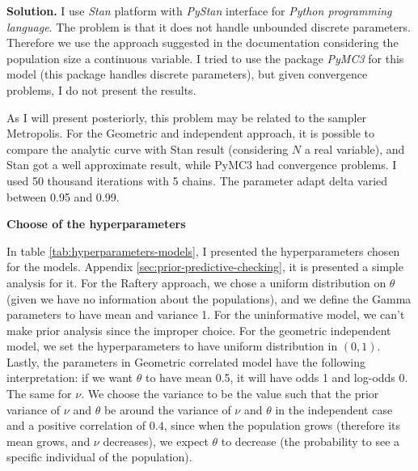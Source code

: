 \vspace{2ex}

    {\bf Solution.} I use {\em Stan} platform with {\em PyStan} interface for
    {\em Python programming language}. The problem is that it does not handle
    unbounded discrete parameters. Therefore we use the approach suggested in
    the documentation \cite{stan} considering the population size a continuous
    variable. I tried to use the package {\em PyMC3} for this model (this
    package handles discrete parameters), but given convergence problems,
    I do not present the results. 
    
    \ind As I will present posteriorly, this problem
    may be related to the sampler Metropolis. For the Geometric and
    independent approach, it is possible to compare the analytic curve with
    Stan result (considering $N$ a real variable), and Stan got a well
    approximate result, while PyMC3 had convergence problems. I used 50
    thousand iterations with 5 chains. The parameter adapt delta varied
    between 0.95 and 0.99. 

    \vspace{2ex}

    {\bf Choose of the hyperparameters}

    \vspace{2ex}

    \ind In table \ref{tab:hyperparameters-models}, I presented the hyperparameters
    chosen for the models. Appendix \ref{sec:prior-predictive-checking}, it is
    presented a simple analysis for it. For the Raftery approach, we chose a
    uniform distribution on $\theta$ (given we have no information about the
    populations), and we define the Gamma parameters to have mean and variance
    1. For the uninformative model, we can't make prior analysis since the
    improper choice. For the geometric independent model, we set the
    hyperparameters to have uniform distribution in $(0,1)$. Lastly, the
    parameters in Geometric correlated model have the following
    interpretation: if we want $\theta$ to have mean 0.5, it will have odds 1
    and log-odds 0. The same for $\nu$. We choose the variance to be the value
    such that the prior variance
    of $\nu$ and $\theta$ be around the variance of $\nu$ and $\theta$ in the independent case and a positive correlation of $0.4$, since when the population grows
    (therefore its mean grows, and $\nu$ decreases), we expect $\theta$ to
    decrease (the probability to see a specific individual of the population). 

